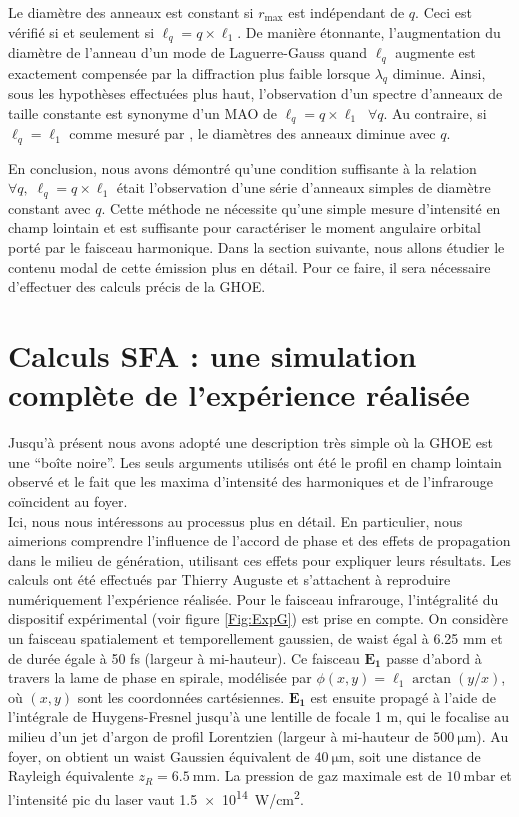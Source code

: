 Le diamètre des anneaux est constant si ${r_{{\mathrm{max}}}}$ est indépendant de $q$. Ceci est vérifié si et seulement si $\ell _q=q\times\ell_1$. De manière étonnante, l'augmentation du diamètre de l'anneau d'un mode de Laguerre-Gauss quand $\ell_q$ augmente est exactement compensée par la diffraction plus faible lorsque $\lambda_q$ diminue. Ainsi, sous les hypothèses effectuées plus haut, l'observation d'un spectre d'anneaux de taille constante est synonyme d'un MAO de $\ell_q=q\times\ell_1\;\;\forall q$. Au contraire, si $\ell_q = \ell_1$ comme mesuré par , le diamètres des anneaux diminue avec $q$. 

En conclusion, nous avons démontré qu'une condition suffisante à la relation $\forall q,\; \ell_q = q\times\ell_1$ était l'observation d'une série d'anneaux simples de diamètre constant avec $q$. Cette méthode ne nécessite qu'une simple mesure d'intensité en champ lointain et est suffisante pour caractériser le moment angulaire orbital porté par le faisceau harmonique. Dans la section suivante, nous allons étudier le contenu modal de cette émission plus en détail. Pour ce faire, il sera nécessaire d'effectuer des calculs précis de la GHOE.

\section{Calculs SFA : une simulation complète de l'expérience réalisée}
Jusqu'à présent nous avons adopté une description très simple où la GHOE est une ``boîte noire''. Les seuls arguments utilisés ont été le profil en champ lointain observé et le fait que les maxima d'intensité des harmoniques et de l'infrarouge coïncident au foyer.\\
Ici, nous nous intéressons au processus plus en détail. En particulier, nous aimerions comprendre l'influence de l'accord de phase et des effets de propagation dans le milieu de génération,  utilisant ces effets pour expliquer leurs résultats. Les calculs ont été effectués par Thierry Auguste et s'attachent à reproduire numériquement l'expérience réalisée. Pour le faisceau infrarouge, l'intégralité du dispositif expérimental (voir figure \ref{Fig:ExpG}) est prise en compte. On considère un faisceau spatialement et temporellement gaussien, de waist égal à 6.25 mm et de durée égale à 50 fs (largeur à mi-hauteur). Ce faisceau $\bm{E_1}$ passe d'abord à travers la lame de phase en spirale, modélisée par $\phi(x,y) = \ell_1 \arctan{(y/x)}$, où $(x,y)$ sont les coordonnées cartésiennes. $\bm{E_1}$ est ensuite propagé à l'aide de l'intégrale de Huygens-Fresnel jusqu'à une lentille de focale 1 m, qui le focalise au milieu d'un jet d'argon de profil Lorentzien (largeur à mi-hauteur de $\SI{500}{\micro\meter}$). Au foyer, on obtient un waist Gaussien équivalent de $\SI{40}{\micro\meter}$, soit une distance de Rayleigh équivalente $z_R=\SI{6,5}\mm$. La pression de gaz maximale est de $\SI{10}{\milli\bar}$ et l'intensité pic du laser vaut \SI{1,5e14}{W/cm^2}.

